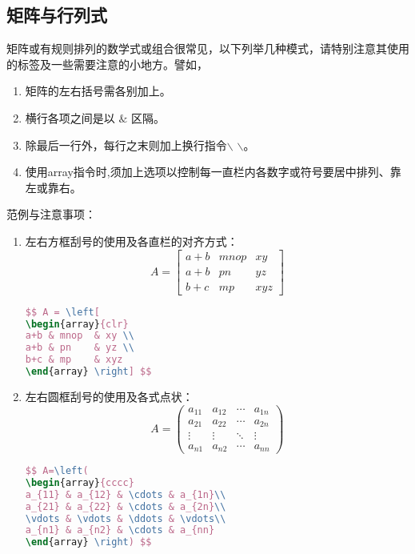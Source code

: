 \subsection{矩阵与行列式}
矩阵或有规则排列的数学式或组合很常见，以下列举几种模式，请特别注意其使用的标签及一些需要注意的小地方。譬如，
\begin{enumerate}%
\item 矩阵的左右括号需各别加上。
\item 横行各项之间是以 $\&$ 区隔。
\item 除最后一行外，每行之末则加上换行指令$\backslash$ $\backslash$。
\item 使用array指令时,须加上选项以控制每一直栏内各数字或符号要居中排列、靠左或靠右。
\end{enumerate}
范例与注意事项：
\begin{enumerate}
  \item 左右方框刮号的使用及各直栏的对齐方式：
        $$ A = \left[
            \begin{array}{clr}
                a+b & mnop  & xy \\
                a+b & pn    & yz \\
                b+c & mp    & xyz
            \end{array} \right] $$
\begin{lstlisting}[language=TeX,numbers=none,frame=lrtb,keywords={begin}]
$$ A = \left[
\begin{array}{clr}
a+b & mnop  & xy \\
a+b & pn    & yz \\
b+c & mp    & xyz
\end{array} \right] $$
\end{lstlisting} 

\item 左右圆框刮号的使用及各式点状：
$$ A=\left(
\begin{array}{cccc}
a_{11} & a_{12} & \cdots & a_{1n}\\
a_{21} & a_{22} & \cdots & a_{2n}\\
\vdots & \vdots & \ddots & \vdots\\
a_{n1} & a_{n2} & \cdots & a_{nn}
\end{array} \right) $$
\begin{lstlisting}[language=TeX,numbers=none,frame=lrtb,keywords={begin}]
$$ A=\left(
\begin{array}{cccc}
a_{11} & a_{12} & \cdots & a_{1n}\\
a_{21} & a_{22} & \cdots & a_{2n}\\
\vdots & \vdots & \ddots & \vdots\\
a_{n1} & a_{n2} & \cdots & a_{nn}
\end{array} \right) $$
\end{lstlisting} 


\end{enumerate}
